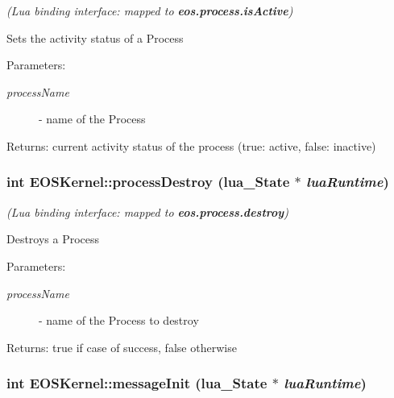 {\em (Lua binding interface: mapped to {\bf eos.process.isActive})\/}\par
\par
 Sets the activity status of a Process 

\begin{Desc}
\item[Parameters:]
\begin{description}
\item[{\em processName}]- name of the Process \end{description}
\end{Desc}
\begin{Desc}
\item[Returns:]current activity status of the process (true: active, false: inactive) \end{Desc}
\hypertarget{structEOSKernel_540af533e83f0920b55b4ad638a76ab5}{
\subsubsection[{processDestroy}]{\setlength{\rightskip}{0pt plus 5cm}int EOSKernel::processDestroy (lua\_\-State $\ast$ {\em luaRuntime})}}
\label{structEOSKernel_540af533e83f0920b55b4ad638a76ab5}


{\em (Lua binding interface: mapped to {\bf eos.process.destroy})\/}\par
\par
 Destroys a Process 

\begin{Desc}
\item[Parameters:]
\begin{description}
\item[{\em processName}]- name of the Process to destroy \end{description}
\end{Desc}
\begin{Desc}
\item[Returns:]true if case of success, false otherwise \end{Desc}
\hypertarget{structEOSKernel_b4212bfe6463d4d660724b74fa23fcca}{
\subsubsection[{messageInit}]{\setlength{\rightskip}{0pt plus 5cm}int EOSKernel::messageInit (lua\_\-State $\ast$ {\em luaRuntime})}}
\label{structEOSKernel_b4212bfe6463d4d660724b74fa23fcca}


